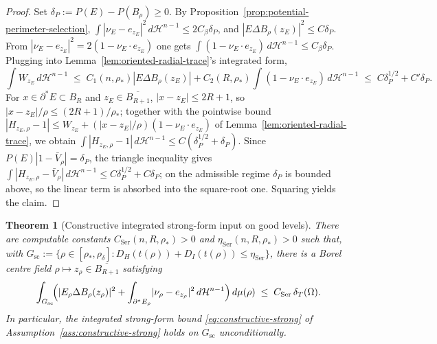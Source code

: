 \documentclass[11pt]{amsart}
\newtheorem{theorem}{Theorem}[section]
\theoremstyle{definition}
\newcommand{\Om}{\Omega}
\newcommand{\dT}{\delta_T}
\newcommand{\rstar}{\rho_*}
\newcommand{\rdel}{\rho_\delta}
\newcommand{\Hn}{\mathcal H^{n-1}}
\newcommand{\Per}{P}
\begin{document}
\begin{proof}
Set \(\delta_P:=\Per(E)-\Per(B_\rho)\ge0\).  By
Proposition~\ref{prop:potential-perimeter-selection},
\(\int|\nu_E-e_{z_E}|^2\,d\Hn\le 2C_\beta\delta_P\), and
\(|E\Delta B_\rho(z_E)|^2\le C\delta_P\).  From
\(|\nu_E-e_{z_E}|^2=2(1-\nu_E\cdot e_{z_E})\) one gets
\(\int(1-\nu_E\cdot e_{z_E})\,d\Hn\le C_\beta\delta_P\).  Plugging into
Lemma~\ref{lem:oriented-radial-trace}'s integrated form,
\[
   \int W_{z_E}\,d\Hn
   \;\le\;C_1(n,\rstar)|E\Delta B_\rho(z_E)|
        +C_2(R,\rstar)\!\int(1-\nu_E\cdot e_{z_E})\,d\Hn
   \;\le\;C\delta_P^{1/2}+C'\delta_P.
\]
For \(x\in\partial^*E\subset B_R\) and \(z_E\in\overline{B_{R+1}}\),
\(|x-z_E|\le2R+1\), so \(|x-z_E|/\rho\le(2R+1)/\rstar\); together with the
pointwise bound \(|H_{z_E,\rho}-1|\le W_{z_E}+(|x-z_E|/\rho)(1-\nu_E\cdot
e_{z_E})\) of Lemma~\ref{lem:oriented-radial-trace}, we obtain
\(\int|H_{z_E,\rho}-1|\,d\Hn\le C(\delta_P^{1/2}+\delta_P)\).  Since
\(\Per(E)|1-\bar V_\rho|=\delta_P\), the triangle inequality gives
\(\int|H_{z_E,\rho}-\bar V_\rho|\,d\Hn\le C\delta_P^{1/2}+C\delta_P\); on the
admissible regime \(\delta_P\) is bounded above, so the linear term is absorbed
into the square-root one.  Squaring yields the claim.
\end{proof}

\begin{theorem}[Constructive integrated strong-form input on good levels]
\label{thm:constructive-strong-good-levels}
There are computable constants \(C_{\mathrm{Ser}}(n,R,\rstar)>0\) and
\(\eta_{\mathrm{Ser}}(n,R,\rstar)>0\) such that, with
\(G_{\mathrm{sc}}:=\{\rho\in[\rstar,\rdel]:D_H(t(\rho))+D_I(t(\rho))\le
\eta_{\mathrm{Ser}}\}\), there is a Borel centre field
\(\rho\mapsto z_\rho\in\overline{B_{R+1}}\) satisfying
\[
   \int_{G_{\mathrm{sc}}}\!\Bigl(|E_\rho\Delta B_\rho(z_\rho)|^2
   +\int_{\partial^*E_\rho}\!|\nu_\rho-e_{z_\rho}|^2\,d\Hn\Bigr)\,d\mu(\rho)
   \;\le\;C_{\mathrm{Ser}}\,\dT(\Om).
\]
In particular, the integrated strong-form bound
\eqref{eq:constructive-strong} of
Assumption~\ref{ass:constructive-strong} holds on \(G_{\mathrm{sc}}\)
unconditionally.
\end{theorem}
\end{document}
